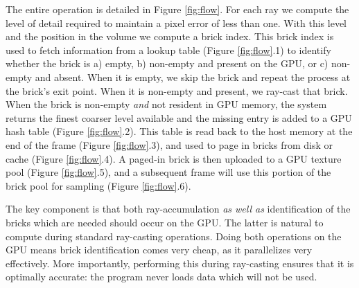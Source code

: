 The entire operation is detailed in Figure \ref{fig:flow}. For each
ray we compute the level of detail required to maintain a pixel error
of less than one. With this level and the position in the volume we
compute a brick index.  This brick index is used to fetch information
from a lookup table
(Figure \ref{fig:flow}.1) to identify whether the brick is a) empty, b)
non-empty and present on the GPU, or c) non-empty and absent. When it
is empty, we skip the brick and repeat the process at the brick's exit
point.  When it is non-empty and present, we ray-cast that brick. When
the brick is non-empty \emph{and} not resident in GPU memory, the
system returns the finest coarser level available and the missing entry
is added to a GPU hash table (Figure
\ref{fig:flow}.2). This table is read back to the host memory at the
end of the frame (Figure \ref{fig:flow}.3), and used to page in bricks
from
disk or cache (Figure \ref{fig:flow}.4).  A paged-in brick is then
uploaded to a GPU texture pool
(Figure \ref{fig:flow}.5), and a subsequent frame will use this
portion of the brick pool for sampling (Figure \ref{fig:flow}.6).


The key component is that both ray-accumulation \emph{as well
as} identification of the bricks which are needed should occur
on the GPU.  The latter is natural to compute during standard
ray-casting operations.  Doing both operations on the GPU means brick
identification comes very cheap, as it parallelizes very effectively.
More importantly, performing this during ray-casting ensures that it
is optimally accurate: the program never loads data which will not be
used.


